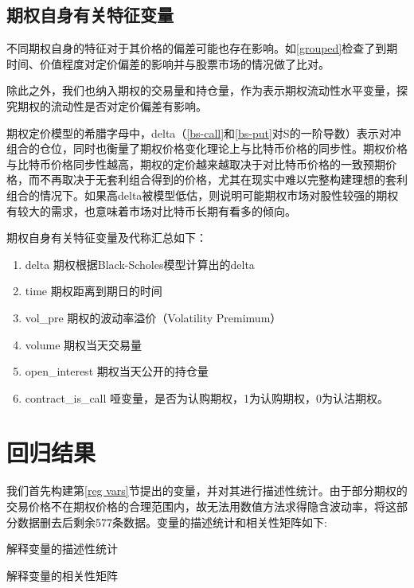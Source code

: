 \subsection{期权自身有关特征变量}
\par{不同期权自身的特征对于其价格的偏差可能也存在影响。如\ref{grouped}检查了到期时间、价值程度对定价偏差的影响并与股票市场的情况做了比对。}
\par{除此之外，我们也纳入期权的交易量和持仓量，作为表示期权流动性水平变量，探究期权的流动性是否对定价偏差有影响。}
\par{期权定价模型的希腊字母中，delta（\ref{bs-call}和\ref{bs-put}对S的一阶导数）表示对冲组合的仓位，同时也衡量了期权价格变化理论上与比特币价格的同步性。期权价格与比特币价格同步性越高，期权的定价越来越取决于对比特币价格的一致预期价格，而不再取决于无套利组合得到的价格，尤其在现实中难以完整构建理想的套利组合的情况下。如果高delta被模型低估，则说明可能期权市场对股性较强的期权有较大的需求，也意味着市场对比特币长期有看多的倾向。}

\par{
    期权自身有关特征变量及代称汇总如下：
}
\begin{enumerate}[(1)]
\item delta 期权根据Black-Scholes模型计算出的delta
\item time 期权距离到期日的时间
\item vol\_pre 期权的波动率溢价（Volatility Premimum）
\item volume 期权当天交易量                                     
\item open\_interest 期权当天公开的持仓量 
\item contract\_is\_call 哑变量，是否为认购期权，1为认购期权，0为认沽期权。 
\end{enumerate}

\section{回归结果}  
我们首先构建第\ref{reg vars}节提出的变量，并对其进行描述性统计。由于部分期权的交易价格不在期权价格的合理范围内，故无法用数值方法求得隐含波动率，将这部分数据删去后剩余577条数据。变量的描述统计和相关性矩阵如下:
\newpage
{}
\begin{landscape} 
\begin{table}[H]
\caption{解释变量的描述性统计}
\resizebox{\linewidth}{!}{

}
\end{table}
\begin{table}[H]
\caption{解释变量的相关性矩阵}
\resizebox{\linewidth}{!}{    }
\end{table}    
\end{landscape}

